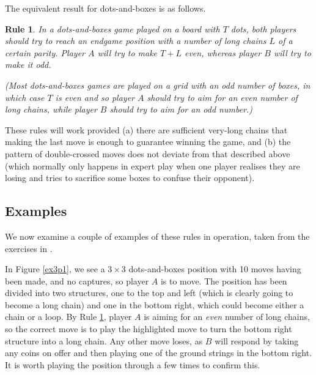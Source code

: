 \documentclass[a4paper,twocolumn]{article}
\newtheorem{dnbparityruleofthumb}[thm]{Rule}
\begin{document}
The equivalent result for dots-and-boxes is as follows.

\begin{dnbparityruleofthumb}\label{dnbparityruleofthumb}
  In a dots-and-boxes game played on a board with $T$ dots, both
  players should try to reach an endgame position with a number of
  long chains $L$ of a certain parity. Player $A$ will try to make
  $T+L$ \emph{even}, whereas player $B$ will try to make it
  \emph{odd}.

  (Most dots-and-boxes games are played on a grid with an odd number
  of boxes, in which case $T$ is even and so player $A$ should try to
  aim for an even number of long chains, while player $B$ should try
  to aim for an odd number.)
\end{dnbparityruleofthumb}

These rules will work provided (a) there are sufficient very-long
chains that making the last move is enough to guarantee winning the
game, and (b) the pattern of double-crossed moves does not deviate
from that described above (which normally only happens in expert play
when one player realises they are losing and tries to sacrifice some
boxes to confuse their opponent).

\subsection{Examples}

We now examine a couple of examples of these rules in operation, taken
from the exercises in \cite{berl}.

In Figure \ref{ex3p1}, we see a $3 \times 3$ dots-and-boxes position
with 10 moves having been made, and no captures, so player $A$ is to
move. The position has been divided into two structures, one to the
top and left (which is clearly going to become a long chain) and one
in the bottom right, which could become either a chain or a loop. By
Rule \ref{dnbparityruleofthumb}, player $A$ is aiming for an
\emph{even} number of long chains, so the correct move is to play the
highlighted move to turn the bottom right structure into a long
chain. Any other move loses, as $B$ will respond by taking any coins
on offer and then playing one of the ground strings in the bottom
right. It is worth playing the position through a few times to confirm
this.

\begin{figure*}
  \centering
  \def\svgscale{0.7}
  
  \caption{Exercise 3.1 from \cite{berl}: $A$ to move, solution highlighted}
  \label{ex3p1}
\end{figure*}
\end{document}
